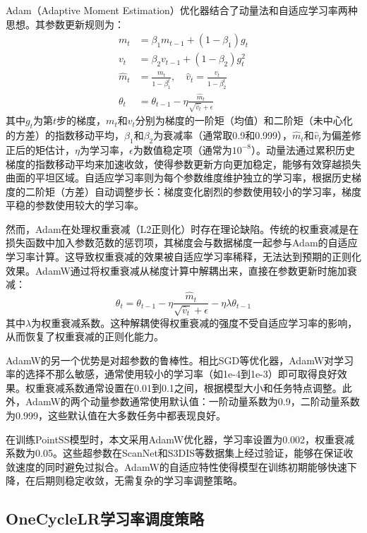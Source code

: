 \documentclass[12pt,a4paper,openany,oneside]{ctexbook}
\theoremstyle{definition}
\theoremstyle{remark}
\begin{document}
Adam（Adaptive Moment Estimation）优化器结合了动量法和自适应学习率两种思想。其参数更新规则为：
\begin{equation}
\begin{aligned}
m_t &= \beta_1 m_{t-1} + (1-\beta_1) g_t \\
v_t &= \beta_2 v_{t-1} + (1-\beta_2) g_t^2 \\
\hat{m}_t &= \frac{m_t}{1-\beta_1^t}, \quad \hat{v}_t = \frac{v_t}{1-\beta_2^t} \\
\theta_t &= \theta_{t-1} - \eta \frac{\hat{m}_t}{\sqrt{\hat{v}_t} + \epsilon}
\end{aligned}
\end{equation}
其中$g_t$为第$t$步的梯度，$m_t$和$v_t$分别为梯度的一阶矩（均值）和二阶矩（未中心化的方差）的指数移动平均，$\beta_1$和$\beta_2$为衰减率（通常取0.9和0.999），$\hat{m}_t$和$\hat{v}_t$为偏差修正后的矩估计，$\eta$为学习率，$\epsilon$为数值稳定项（通常为$10^{-8}$）。动量法通过累积历史梯度的指数移动平均来加速收敛，使得参数更新方向更加稳定，能够有效穿越损失曲面的平坦区域。自适应学习率则为每个参数维度维护独立的学习率，根据历史梯度的二阶矩（方差）自动调整步长：梯度变化剧烈的参数使用较小的学习率，梯度平稳的参数使用较大的学习率。

然而，Adam在处理权重衰减（L2正则化）时存在理论缺陷。传统的权重衰减是在损失函数中加入参数范数的惩罚项，其梯度会与数据梯度一起参与Adam的自适应学习率计算。这导致权重衰减的效果被自适应学习率稀释，无法达到预期的正则化效果。AdamW通过将权重衰减从梯度计算中解耦出来，直接在参数更新时施加衰减：
\begin{equation}
\theta_t = \theta_{t-1} - \eta \frac{\hat{m}_t}{\sqrt{\hat{v}_t} + \epsilon} - \eta \lambda \theta_{t-1}
\end{equation}
其中$\lambda$为权重衰减系数。这种解耦使得权重衰减的强度不受自适应学习率的影响，从而恢复了权重衰减的正则化能力。

AdamW的另一个优势是对超参数的鲁棒性。相比SGD等优化器，AdamW对学习率的选择不那么敏感，通常使用较小的学习率（如1e-4到1e-3）即可取得良好效果。权重衰减系数通常设置在0.01到0.1之间，根据模型大小和任务特点调整。此外，AdamW的两个动量参数通常使用默认值：一阶动量系数为0.9，二阶动量系数为0.999，这些默认值在大多数任务中都表现良好。

在训练PointSS模型时，本文采用AdamW优化器，学习率设置为0.002，权重衰减系数为0.05。这些超参数在ScanNet和S3DIS等数据集上经过验证，能够在保证收敛速度的同时避免过拟合。AdamW的自适应特性使得模型在训练初期能够快速下降，在后期则稳定收敛，无需复杂的学习率调整策略。

\subsection{OneCycleLR学习率调度策略}
\end{document}
